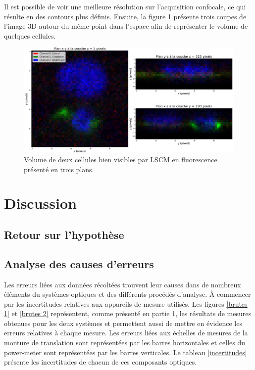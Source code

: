 \documentclass[11pt,letterpaper]{article}
\begin{document}
Il est possible de voir une meilleure résolution sur l'acquisition confocale, ce qui résulte en des contours plus définis. Ensuite, la figure \ref{3d_cells} présente trois coupes de l'image 3D autour du même point dans l'espace afin de
représenter le volume de quelques cellules.

\begin{figure}[H]
  \centering
  \includegraphics[scale=0.34]{volume.png}
  \caption{Volume de deux cellules bien visibles par LSCM en fluorescence présenté en trois plans.}
  \label{3d_cells}
\end{figure}


\section{Discussion}

\subsection{Retour sur l'hypothèse}


\subsection{Analyse des causes d'erreurs}

Les erreurs liées aux données récoltées trouvent leur causes dans de nombreux éléments du systèmes optiques et des différents procédés d'analyse. À commencer par les incertitudes relatives aux appareils de mesure utilisés. Les figures \ref{brutes 1} et \ref{brutes 2} représentent, comme présenté en partie 1, les résultats de mesures obtenues pour les deux systèmes et permettent aussi de mettre en évidence les erreurs relatives à chaque mesure. Les erreurs liées aux échelles de mesures de la monture de translation sont représentées par les barres horizontales et celles du power-meter sont représentées par les barres verticales. Le tableau \ref{incertitudes} présente les incertitudes de chacun de ces composants optiques. 
\end{document}
